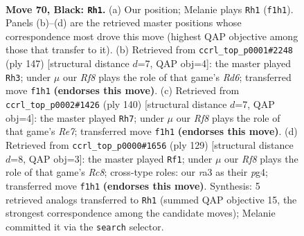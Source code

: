 \documentclass[11pt]{article}
\begin{document}
\clearpage

\begin{figure}[p]\centering
\begin{subfigure}{0.46\textwidth}\centering
\resizebox{\linewidth}{!}{%
\newchessgame
\chessboard[
  setfen={8/8/8/1k6/8/R2N4/3K2P1/5r2 b - - 5 70},
  showmover=false,
  pgfstyle=straightmove, color=movearrow, markmove={f1-h1}
]}
\caption{}
\end{subfigure}\hfill
\begin{subfigure}{0.46\textwidth}\centering
\resizebox{\linewidth}{!}{%
\newchessgame
\chessboard[
  setfen={8/8/1k2K3/5N2/1p6/3r4/2R5/8 b - - 6 74},
  showmover=false,
  pgfstyle=straightmove, color=movearrow, markmove={d3-h3}
]}
\caption{}
\end{subfigure}
\\[4pt]
\begin{subfigure}{0.46\textwidth}\centering
\resizebox{\linewidth}{!}{%
\newchessgame
\chessboard[
  setfen={5r2/4R3/8/2n5/3k4/P7/8/6K1 w - - 6 71},
  showmover=false,
  pgfstyle=straightmove, color=movearrow, markmove={e7-h7}
]}
\caption{}
\end{subfigure}\hfill
\begin{subfigure}{0.46\textwidth}\centering
\resizebox{\linewidth}{!}{%
\newchessgame
\chessboard[
  setfen={8/6k1/1P1NK3/8/6P1/8/8/2r5 b - - 0 65},
  showmover=false,
  pgfstyle=straightmove, color=movearrow, markmove={c1-f1}
]}
\caption{}
\end{subfigure}
\caption{\textbf{Move 70, Black: \texttt{Rh1}.} (a) Our position; Melanie plays \texttt{Rh1} (\texttt{f1h1}). Panels (b)--(d) are the retrieved master positions whose correspondence most drove this move (highest QAP objective among those that transfer to it). (b) Retrieved from \texttt{ccrl\_top\_p0001\#2248} (ply 147) [structural distance $d$=7, QAP obj=4]: the master played \texttt{Rh3}; under $\mu$ our \emph{Rf8} plays the role of that game's \emph{Rd6}; transferred move \texttt{f1h1} \textbf{(endorses this move)}. (c) Retrieved from \texttt{ccrl\_top\_p0002\#1426} (ply 140) [structural distance $d$=7, QAP obj=4]: the master played \texttt{Rh7}; under $\mu$ our \emph{Rf8} plays the role of that game's \emph{Re7}; transferred move \texttt{f1h1} \textbf{(endorses this move)}. (d) Retrieved from \texttt{ccrl\_top\_p0000\#1656} (ply 129) [structural distance $d$=8, QAP obj=3]: the master played \texttt{Rf1}; under $\mu$ our \emph{Rf8} plays the role of that game's \emph{Rc8}; cross-type roles: our \emph{r}a3 as their \emph{p}g4; transferred move \texttt{f1h1} \textbf{(endorses this move)}. Synthesis: 5 retrieved analogs transferred to \texttt{Rh1} (summed QAP objective 15, the strongest correspondence among the candidate moves); Melanie committed it via the \texttt{search} selector.}
\label{fig:thought-m139}
\end{figure}
\end{document}
